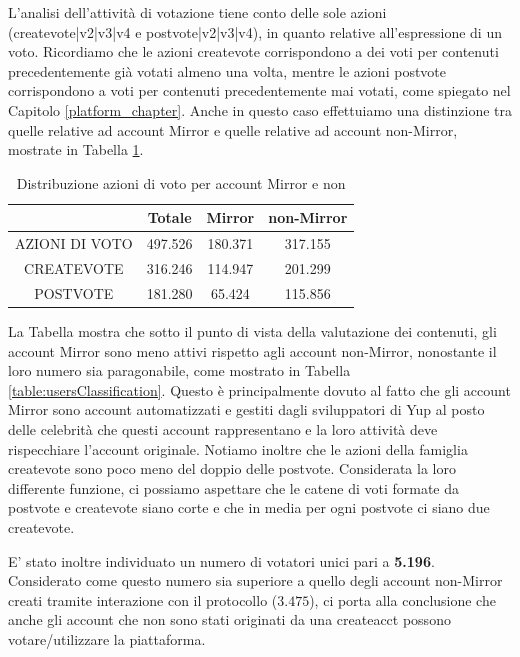 L'analisi dell'attività di votazione tiene conto delle sole azioni (createvote|v2|v3|v4 e postvote|v2|v3|v4), in quanto relative all'espressione di un voto.
Ricordiamo che le azioni createvote corrispondono a dei voti per contenuti precedentemente già votati almeno una volta, mentre le azioni postvote corrispondono a voti per contenuti precedentemente mai votati, come spiegato nel Capitolo \ref{platform_chapter}.
Anche in questo caso effettuiamo una distinzione tra quelle relative ad account Mirror e quelle relative ad account non-Mirror, mostrate in Tabella \ref{tab:votingactionsDistribution}.

\begin{table}
\centering
\begin{tabular}{ |c|c|c|c| }
 \hline
  & Totale & Mirror & non-Mirror \\
 \hline
 AZIONI DI VOTO & 497.526 & 180.371 & 317.155 \\
 \hline
 CREATEVOTE & 316.246 & 114.947 & 201.299 \\
 \hline
 POSTVOTE & 181.280 & 65.424 & 115.856 \\
 \hline
\end{tabular}
\caption{Distribuzione azioni di voto per account Mirror e non}
\label{tab:votingactionsDistribution}
\end{table}

La Tabella mostra che sotto il punto di vista della valutazione dei contenuti, gli account Mirror sono meno attivi rispetto agli account non-Mirror, nonostante il loro numero sia paragonabile, come mostrato in Tabella \ref{table:usersClassification}. Questo è principalmente dovuto al fatto che gli account Mirror sono account automatizzati e gestiti dagli sviluppatori di Yup al posto delle celebrità che questi account rappresentano e la loro attività deve rispecchiare l'account originale.
Notiamo inoltre che le azioni della famiglia createvote sono poco meno del doppio delle postvote.
Considerata la loro differente funzione, ci possiamo aspettare che le catene di voti formate da postvote e createvote siano corte e che in media per ogni postvote ci siano due createvote.


E' stato inoltre individuato un numero di votatori unici pari a \textbf{5.196}. Considerato come questo numero sia superiore a quello degli account non-Mirror creati tramite interazione con il protocollo (\textit{$3.475$}), ci porta alla conclusione che anche gli account che non sono stati originati da una createacct possono votare/utilizzare la piattaforma.


